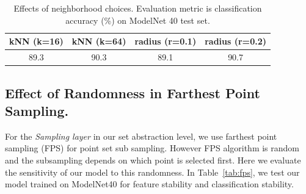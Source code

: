 \begin{table}[h!]
\centering
\begin{tabular}{cccc}
\toprule
kNN (k=16) & kNN (k=64) & radius (r=0.1) & radius (r=0.2) \\ \midrule
89.3 & 90.3 & 89.1 & 90.7 \\ \bottomrule
\end{tabular}
\caption{Effects of neighborhood choices. Evaluation metric is classification accuracy (\%) on ModelNet 40 test set.}
\label{tab:neighborhood}
\end{table}

\subsection{Effect of Randomness in Farthest Point Sampling.}
For the \emph{Sampling layer} in our set abstraction level, we use farthest point sampling (FPS) for point set sub sampling. However FPS algorithm is random and the subsampling depends on which point is selected first. Here we evaluate the sensitivity of our model to this randomness. In Table~\ref{tab:fps}, we test our model trained on ModelNet40 for feature stability and classification stability.


